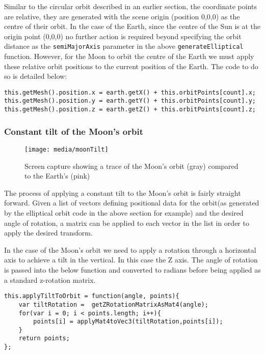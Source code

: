 \documentclass[titlepage]{article}
\begin{document}
Similar to the circular orbit described in an earlier section, the coordinate points are relative, they are generated with the scene origin (position 0,0,0) as the centre of their orbit. In the case of the Earth, since the centre of the Sun is at the origin point (0,0,0) no further action is required beyond specifying the orbit distance as the \texttt{semiMajorAxis} parameter in the above \texttt{generateElliptical} function. However, for the Moon to orbit the centre of the Earth we must apply these relative orbit positions to the current position of the Earth. The code to do so is detailed below:
\begin{lstlisting}[caption=Code taken from Moon.js showing the moon mesh position being set as that of the Earth plus the relative axis positions from the orbital point list]
this.getMesh().position.x = earth.getX() + this.orbitPoints[count].x;
this.getMesh().position.y = earth.getY() + this.orbitPoints[count].y;
this.getMesh().position.z = earth.getZ() + this.orbitPoints[count].z;

\end{lstlisting}


\subsubsection{Constant tilt of the Moon’s orbit}
\begin{figure}[h!]
                \centering
                \texttt{[image: media/moonTilt]}
                \caption{Screen capture showing a trace of the Moon's orbit (gray) compared to the Earth's (pink)}
\end{figure}

The process of applying a constant tilt to the Moon's orbit is fairly straight forward. Given a list of vectors defining positional data for the orbit(as generated by the elliptical orbit code in the above section for example) and the desired angle of rotation, a matrix can be applied to each vector in the list in order to apply the desired transform.

In the case of the Moon's orbit we need to apply a rotation through a horizontal axis to achieve a tilt in the vertical. In this case the Z axis. The angle of rotation is passed into the below function and converted to radians before being applied as a standard z-rotation matrix. 
\begin{lstlisting}[caption=Above code can be found in OrbitUtils.js]
this.applyTiltToOrbit = function(angle, points){
    var tiltRotation =  getZRotationMatrixAsMat4(angle);
    for(var i = 0; i < points.length; i++){
        points[i] = applyMat4toVec3(tiltRotation,points[i]);
    }
    return points;
};
\end{lstlisting}
\end{document}
